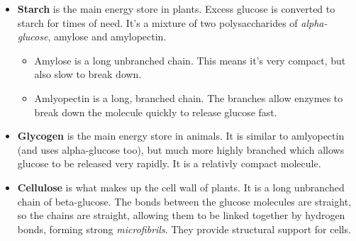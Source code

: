 \documentclass{article}
\begin{document}
\begin{itemize}

	\item {\bf Starch} is the main energy store in plants. Excess glucose is
	converted to starch for times of need. It's a mixture of two
	polysaccharides of {\it alpha-glucose}, amylose and amylopectin.

	\begin{itemize}

		\item Amylose is a long unbranched chain. This means it's very compact,
		but also slow to break down.

		\item Amlyopectin is a long, branched chain. The branches allow enzymes
		to break down the molecule quickly to release glucose fast.

	\end{itemize}

	\item {\bf Glycogen} is the main energy store in animals. It is similar to
	amlyopectin (and uses alpha-glucose too), but much more highly branched
	which allows glucose to be released very rapidly. It is a relativly compact
	molecule.

	\item {\bf Cellulose} is what makes up the cell wall of plants. It is a long
	unbranched chain of beta-glucose. The bonds between the glucose molecules
	are straight, so the chains are straight, allowing them to be linked
	together by hydrogen bonds, forming strong {\it microfibrils}. They provide
	structural support for cells.

\end{itemize}
\end{document}
